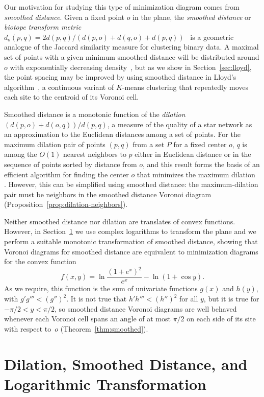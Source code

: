 \documentclass[10pt, conference, compsocconf]{IEEEtran}
\begin{document}
Our motivation for studying this type of minimization diagram comes from \emph{smoothed distance}. Given a fixed point $o$ in the plane, the \emph{smoothed distance} or \emph{biotope transform metric} $d_o(p,q)=2d(p,q)/(d(p,o)+d(q,o)+d(p,q))$~\cite{Cla-UCI-08,DezDez-09} is a geometric analogue of the Jaccard similarity measure for clustering binary data.  A maximal set of points with a given minimum smoothed distance will be distributed around $o$ with exponentially decreasing density~\cite{Cla-UCI-08}, but as we show in Section~\ref{sec:lloyd}, the point spacing may be improved by using smoothed distance in Lloyd's algorithm~\cite{DuFabGun-SR-99,Llo-ITIT-82}, a continuous variant of $K$-means clustering that repeatedly moves each site to the centroid of its Voronoi cell.

Smoothed distance is a monotonic function of the \emph{dilation} $(d(p,o)+d(o,q))/d(p,q)$, a measure of the quality of a star network as an approximation to the Euclidean distances among a set of points. For the maximum dilation pair of points $(p,q)$ from a set $P$ for a fixed center $o$, $q$ is among the $O(1)$ nearest neighbors to $p$ either in Euclidean distance or in the sequence of points sorted by distance from $o$, and this result forms the basis of an efficient algorithm for finding the center $o$ that minimizes the maximum dilation~\cite{EppWor-CGTA-07} . However, this can be simplified using smoothed distance: the maximum-dilation pair must be neighbors in the smoothed distance Voronoi diagram (Proposition~\ref{prop:dilation-neighbors}).

Neither smoothed distance nor dilation are translates of convex functions. However, in Section~\ref{sec:xform} we use complex logarithms to transform the plane and we perform a suitable monotonic transformation of smoothed distance, showing that Voronoi diagrams for smoothed distance are equivalent to minimization diagrams for the convex function
$$f(x,y)=\ln\frac{(1+e^x)^2}{e^x} - \ln (1+\cos y).$$
As we require, this function is the sum of univariate functions $g(x)$ and $h(y)$, with $g'g'''<(g'')^2$. It is not true that $h'h'''<(h'')^2$ for all $y$, but it is true for $-\pi/2<y<\pi/2$, so smoothed distance Voronoi diagrams are well behaved whenever each Voronoi cell spans an angle of at most $\pi/2$ on each side of its site with respect to~$o$ (Theorem~\ref{thm:smoothed}).

\section{Dilation, Smoothed Distance, and Logarithmic Transformation}
\label{sec:xform}
\end{document}
